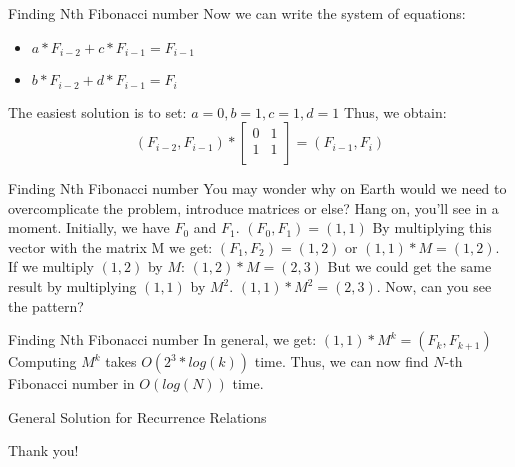 \documentclass{beamer}
\begin{document}
\begin{frame}{Finding Nth Fibonacci number}
  Now we can write the system of equations:
  \begin{itemize}
    \item 
      $a * F_{i-2} + c * F_{i-1} = F_{i-1}$
    \item
      $b * F_{i-2} + d * F_{i-1} = F_i$
  \end{itemize}
  \pause
  The easiest solution is to set:
  \newline
  $a = 0, b = 1, c = 1, d = 1$
  \pause \newline
  Thus, we obtain:
  \[
    (F_{i-2}, F_{i-1})
    *
    \left[ {
      \begin{array}{cc}
        0 & 1 \\
        1 & 1 \\      
      \end{array} } 
    \right]
    = (F_{i-1}, F_i)
  \]
\end{frame}

\begin{frame}{Finding Nth Fibonacci number}
  You may wonder why on Earth would we need to overcomplicate the problem, introduce matrices or else?
  \newline Hang on, you'll see in a moment.
  \pause \newline
  Initially, we have $F_0$ and $F_1$.
  \newline
  $(F_0, F_1) = (1, 1)$
  \pause \newline
  By multiplying this vector with the matrix M we get:
  \newline
  $(F_1, F_2) = (1, 2)$ or $(1, 1) * M = (1, 2)$.
  \pause \newline
  If we multiply $(1, 2)$ by $M$:
  \newline
  $(1, 2) * M = (2, 3)$
  \pause \newline
  But we could get the same result by multiplying $(1, 1)$ by $M^2$.
  \newline
  $(1, 1) * M^2 = (2, 3)$.
  \pause \newline Now, can you see the pattern?
\end{frame}

\begin{frame}{Finding Nth Fibonacci number}
  In general, we get:
  \newline
  $(1, 1) * M^k = (F_k, F_{k+1})$
  \pause \newline
  Computing $M^k$ takes $O(2^3 * log(k))$ time. 
  \newline
  Thus, we can now find $N$-th Fibonacci number in $O(log(N))$ time.
\end{frame}

\begin{frame}{General Solution for Recurrence Relations}
  
\end{frame}

\begin{frame}{}
		\LARGE{\centerline{Thank you!}}
\end{frame}
\end{document}
